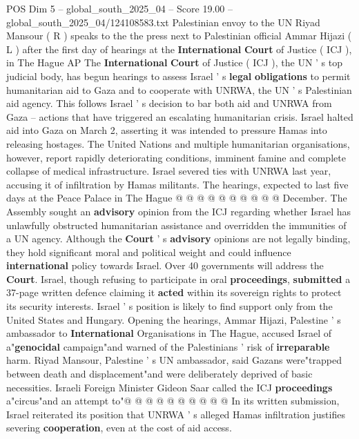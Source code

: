 \begin{textsample}{POS Dim 5 – global\_south\_2025\_04 – Score 19.00 – global\_south\_2025\_04/124108583.txt}  \label{ex:f5_pos_062}
Palestinian envoy to the UN Riyad Mansour ( R ) speaks to the the press next to Palestinian official Ammar Hijazi ( L ) after the first day of hearings at the \textbf{International} \textbf{Court} of Justice ( ICJ ), in The Hague AP The \textbf{International} \textbf{Court} of Justice ( ICJ ), the UN ' s top judicial body, has begun hearings to assess Israel ' s \textbf{legal} \textbf{obligations} to permit humanitarian aid to Gaza and to cooperate with UNRWA, the UN ' s Palestinian aid agency.
This follows Israel ' s decision to bar both aid and UNRWA from Gaza -- actions that have triggered an escalating humanitarian crisis.
Israel halted aid into Gaza on March 2, asserting it was intended to pressure Hamas into releasing hostages.
The United Nations and multiple humanitarian organisations, however, report rapidly deteriorating conditions, imminent famine and complete collapse of medical infrastructure.
Israel severed ties with UNRWA last year, accusing it of infiltration by Hamas militants.
The hearings, expected to last five days at the Peace Palace in The Hague @ @ @ @ @ @ @ @ @ @ December.
The Assembly sought an \textbf{advisory} opinion from the ICJ regarding whether Israel has unlawfully obstructed humanitarian assistance and overridden the immunities of a UN agency.
Although the \textbf{Court} ' s \textbf{advisory} opinions are not legally binding, they hold significant moral and political weight and could influence \textbf{international} policy towards Israel.
Over 40 governments will address the \textbf{Court}.
Israel, though refusing to participate in oral \textbf{proceedings}, \textbf{submitted} a 37-page written defence claiming it \textbf{acted} within its sovereign rights to protect its security interests.
Israel ' s position is likely to find support only from the United States and Hungary.
Opening the hearings, Ammar Hijazi, Palestine ' s ambassador to \textbf{International} Organisations in The Hague, accused Israel of a"\textbf{genocidal} campaign"and warned of the Palestinians ' risk of \textbf{irreparable} harm.
Riyad Mansour, Palestine ' s UN ambassador, said Gazans were"trapped between death and displacement"and were deliberately deprived of basic necessities.
Israeli Foreign Minister Gideon Saar called the ICJ \textbf{proceedings} a"circus"and an attempt to"@ @ @ @ @ @ @ @ @ @ In its written submission, Israel reiterated its position that UNRWA ' s alleged Hamas infiltration justifies severing \textbf{cooperation}, even at the cost of aid access.

\end{textsample}

